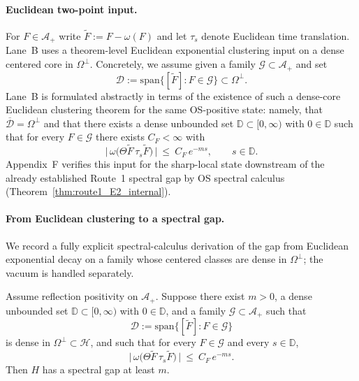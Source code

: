 \paragraph{Euclidean two-point input.}
For $F\in\mathcal A_+$ write $\widetilde F:=F-\omega(F)$ and let $\tau_s$ denote Euclidean time translation.
Lane~B uses a theorem-level Euclidean exponential clustering input on a dense centered core in $\Omega^\perp$.
Concretely, we assume given a family $\mathcal G\subset\mathcal A_+$ and set
\[
\mathcal D:=\mathrm{span}\{[\widetilde F]:F\in\mathcal G\}\subset\Omega^\perp.
\]
Lane~B is formulated abstractly in terms of the existence of such a dense-core Euclidean clustering theorem for the same OS-positive state: namely, that $\overline{\mathcal D}=\Omega^\perp$ and that there exists a dense unbounded set $\mathbb D\subset[0,\infty)$ with $0\in\mathbb D$ such that for every $F\in\mathcal G$ there exists $C_F<\infty$ with
\[
\big|\,\omega\big(\Theta\widetilde F\,\tau_s\widetilde F\big)\,\big|\ \le\ C_F\,e^{-ms},
\qquad s\in\mathbb D.
\]
Appendix~F verifies this input for the sharp-local state downstream of the already established Route~1 spectral gap by OS spectral calculus
(Theorem~\ref{thm:route1_E2_internal}).

\paragraph{From Euclidean clustering to a spectral gap.}
We record a fully explicit spectral-calculus derivation of the gap from Euclidean exponential decay on a family whose centered classes are dense in $\Omega^\perp$; the vacuum is handled separately.

\begin{proposition}\label{prop:R1_E2_to_R1_HS}
Assume reflection positivity on $\mathcal A_+$.
Suppose there exist $m>0$, a dense unbounded set $\mathbb D\subset[0,\infty)$ with $0\in\mathbb D$, and a family $\mathcal G\subset\mathcal A_+$ such that
\[
\mathcal D:=\mathrm{span}\{[\widetilde F]:F\in\mathcal G\}
\]
is dense in $\Omega^\perp\subset\mathcal H$, and such that for every $F\in\mathcal G$ and every $s\in\mathbb D$,
\[
\big|\,\omega\big(\Theta\widetilde F\,\tau_s\widetilde F\big)\,\big|\ \le\ C_F\,e^{-ms}.
\]
Then $H$ has a spectral gap at least $m$.
\end{proposition}

